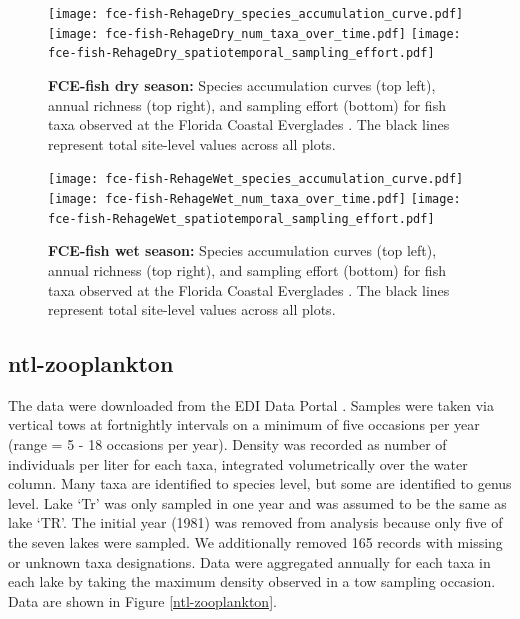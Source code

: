 \documentclass[11pt, oneside]{article}
\begin{document}
\begin{figure}[h!]
\centering
\texttt{[image: fce-fish-RehageDry\_species\_accumulation\_curve.pdf]}
\texttt{[image: fce-fish-RehageDry\_num\_taxa\_over\_time.pdf]}
\texttt{[image: fce-fish-RehageDry\_spatiotemporal\_sampling\_effort.pdf]}
\caption{{\bf FCE-fish dry season:} Species accumulation curves (top left),  annual richness (top right), and sampling effort (bottom)  for fish taxa observed at the Florida Coastal Everglades . The black lines represent total site-level values across all plots.}
\label{fce-fish-dry}
\end{figure}

\begin{figure}[h!]
\centering
\texttt{[image: fce-fish-RehageWet\_species\_accumulation\_curve.pdf]}
\texttt{[image: fce-fish-RehageWet\_num\_taxa\_over\_time.pdf]}
\texttt{[image: fce-fish-RehageWet\_spatiotemporal\_sampling\_effort.pdf]}
\caption{{\bf FCE-fish wet season:} Species accumulation curves (top left),  annual richness (top right), and sampling effort (bottom)  for fish taxa observed at the Florida Coastal Everglades . The black lines represent total site-level values across all plots.}
\label{fce-fish-wet}
\end{figure}



\newpage
\subsection {ntl-zooplankton}
The data were downloaded from the EDI Data Portal \citep{ntl-zooplankton}.
Samples were taken  via vertical tows at fortnightly intervals on a minimum of five occasions per year (range = 5 - 18 occasions per year).
Density was recorded as number of individuals per liter for each taxa, integrated volumetrically over the water column.
Many taxa are identified to species level, but some are identified to genus level.
Lake `Tr'  was only sampled in one year and was assumed to be the same as lake `TR'. %
The initial year (1981) was removed from analysis because only five of the seven lakes were sampled.
We additionally removed 165 records with missing or unknown taxa designations.
Data were aggregated annually for each taxa in each lake by taking the maximum density observed in a tow sampling occasion.
Data are shown in Figure \ref{ntl-zooplankton}.
\end{document}
